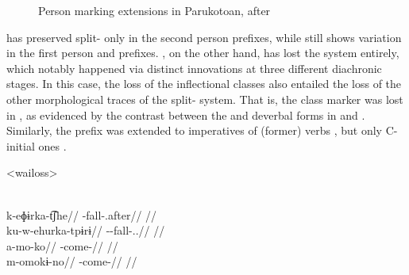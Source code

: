 \begin{figure}[hbt]
	\centering
	\setlength{\tabcolsep}{2pt}
	\caption{Person marking extensions in Parukotoan, after \textcite[94]{gildea1998}}
	\label{fig:par_ext}
\end{figure}

\hixka has preserved split- only in the second person prefixes, while \kaxui still shows variation in the first person and  prefixes.
\waiwai, on the other hand, has lost the system entirely, which notably happened via distinct innovations at three different diachronic stages.
In this case, the loss of the inflectional classes also entailed the loss of the other morphological traces of the split- system.
That is, the  class marker   was lost in \waiwai, as evidenced by the contrast between the \waiwai and \kaxui deverbal forms in  and .
Similarly, the  prefix  was extended to imperatives of (former)  verbs , but only C-initial ones \parencite[62]{waiwaihawkins1998}.

\pex<wailoss>
\begin{multicols}{2}
	\a<wai-158> \waiwai \parencite[][98]{waiwaihawkins1998}\\
	\begingl
	\gla k-eɸɨrka-t͡ʃhe//
	\glb {}-fall-.after//
	\glft {}//
	\endgl
	\a<kax-138> \kaxui \parencite[][49]{schuring2018kaxuyana}\\
	\begingl
	\gla ku-w-ehurka-tpɨrɨ//
	\glb {}--fall-..//
	\glft {}//
	\endgl
	\a<wai-112> \waiwai \parencite[][177]{waiwaihawkins1998}\\
	\begingl
	\gla a-mo-ko//
	\glb {}-come-//
	\glft {}//
	\endgl
	\a<hix-43> \hixka \parencite[][191]{hixkaryanaderby1985}\\
	\begingl
	\gla m-omokɨ-no//
	\glb {}-come-//
	\glft {}//
	\endgl
\end{multicols}
\xe


